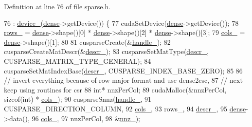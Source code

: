 Definition at line 76 of file sparse.\+h.


\begin{DoxyCode}
76                     : \hyperlink{classmarian_1_1sparse_1_1CSR_a9466b731ae5e8bebd9713b8d6651dc41}{device\_}(\hyperlink{namespacemarian_1_1mlp_a8c25b1e343bf78e66cd9e33e607efeb5}{dense}->getDevice()) \{
77     cudaSetDevice(\hyperlink{namespacemarian_1_1mlp_a8c25b1e343bf78e66cd9e33e607efeb5}{dense}->getDevice());
78     \hyperlink{classmarian_1_1sparse_1_1CSR_adc2e92a08b1ac2c6ace0c1283e4c353e}{rows\_} = \hyperlink{namespacemarian_1_1mlp_a8c25b1e343bf78e66cd9e33e607efeb5}{dense}->shape()[0] * \hyperlink{namespacemarian_1_1mlp_a8c25b1e343bf78e66cd9e33e607efeb5}{dense}->shape()[2] * \hyperlink{namespacemarian_1_1mlp_a8c25b1e343bf78e66cd9e33e607efeb5}{dense}->shape()[3];
79     \hyperlink{classmarian_1_1sparse_1_1CSR_a308d9860a310b4cac456780b705ede57}{cols\_} = \hyperlink{namespacemarian_1_1mlp_a8c25b1e343bf78e66cd9e33e607efeb5}{dense}->shape()[1];
80 
81     cusparseCreate(&\hyperlink{classmarian_1_1sparse_1_1CSR_a3bfb6efc65c5b85247ca0cd2a8863c00}{handle\_});
82     cusparseCreateMatDescr(&\hyperlink{classmarian_1_1sparse_1_1CSR_aefc692180153e470c2d6256eb4ec3f5b}{descr\_});
83     cusparseSetMatType(\hyperlink{classmarian_1_1sparse_1_1CSR_aefc692180153e470c2d6256eb4ec3f5b}{descr\_}, CUSPARSE\_MATRIX\_TYPE\_GENERAL);
84     cusparseSetMatIndexBase(\hyperlink{classmarian_1_1sparse_1_1CSR_aefc692180153e470c2d6256eb4ec3f5b}{descr\_}, CUSPARSE\_INDEX\_BASE\_ZERO);
85 
86     \textcolor{comment}{// invert everything because of row-major format and use dense2csc,}
87     \textcolor{comment}{// next keep using routines for csr}
88     \textcolor{keywordtype}{int}* nnzPerCol;
89     cudaMalloc(&nnzPerCol, \textcolor{keyword}{sizeof}(\textcolor{keywordtype}{int}) * \hyperlink{classmarian_1_1sparse_1_1CSR_a308d9860a310b4cac456780b705ede57}{cols\_});
90     cusparseSnnz(\hyperlink{classmarian_1_1sparse_1_1CSR_a3bfb6efc65c5b85247ca0cd2a8863c00}{handle\_},
91                  CUSPARSE\_DIRECTION\_COLUMN,
92                  \hyperlink{classmarian_1_1sparse_1_1CSR_a308d9860a310b4cac456780b705ede57}{cols\_},
93                  rows\_,
94                  \hyperlink{classmarian_1_1sparse_1_1CSR_aefc692180153e470c2d6256eb4ec3f5b}{descr\_},
95                  \hyperlink{namespacemarian_1_1mlp_a8c25b1e343bf78e66cd9e33e607efeb5}{dense}->data(),
96                  \hyperlink{classmarian_1_1sparse_1_1CSR_a308d9860a310b4cac456780b705ede57}{cols\_},
97                  nnzPerCol,
98                  &\hyperlink{classmarian_1_1sparse_1_1CSR_a567e83de09f28445aa97c6374477b8fa}{nnz\_});

\end{DoxyCode}
